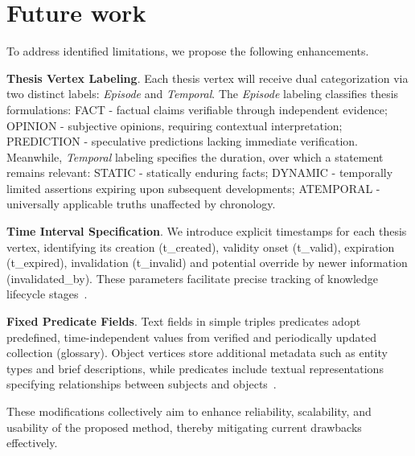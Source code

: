 \section{Future work}

To address identified limitations, we propose the following enhancements.

\textbf{Thesis Vertex Labeling}. Each thesis vertex will receive dual categorization via two distinct labels: \textit{Episode} and \textit{Temporal}. The \textit{Episode} labeling classifies thesis formulations: FACT -  factual claims verifiable through independent evidence; OPINION - subjective opinions, requiring contextual interpretation;  PREDICTION - speculative predictions lacking immediate verification. Meanwhile, \textit{Temporal} labeling specifies the duration, over which a statement remains relevant: STATIC - statically enduring facts; DYNAMIC - temporally limited assertions expiring upon subsequent developments; ATEMPORAL - universally applicable truths unaffected by chronology.

\textbf{Time Interval Specification}. We introduce explicit timestamps for each thesis vertex, identifying its creation (t\_created), validity onset (t\_valid), expiration (t\_expired), invalidation (t\_invalid) and potential override by newer information (invalidated\_by). These parameters facilitate precise tracking of knowledge lifecycle stages~\cite{Rasmussen2025ZepAT}.

\textbf{Fixed Predicate Fields}. Text fields in simple triples predicates adopt predefined, time-independent values from verified and periodically updated collection (glossary). Object vertices store additional metadata such as entity types and brief descriptions, while predicates include textual representations specifying relationships between subjects and objects~\cite{zhang-soh-2024-extract}.

These modifications collectively aim to enhance reliability, scalability, and usability of the proposed method, thereby mitigating current drawbacks effectively.
